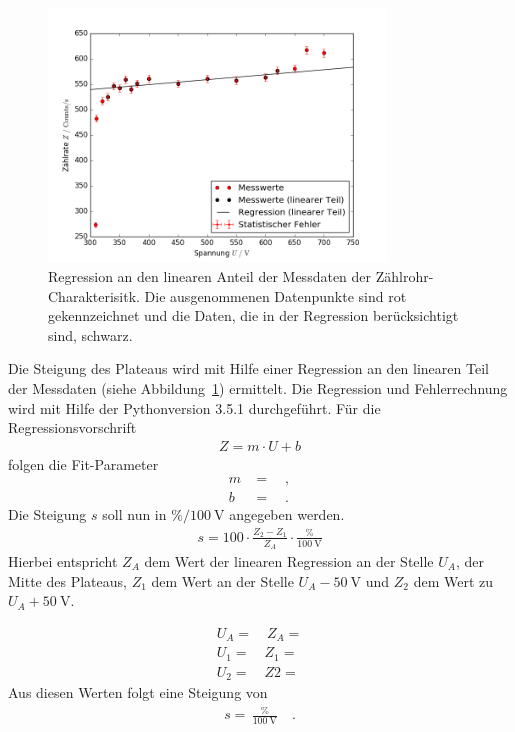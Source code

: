 \begin{figure}[h!]
	\centering
	\includegraphics[width=0.8\textwidth]{build/charakteristik_linear.png}
	\caption{Regression an den linearen Anteil der Messdaten der Zählrohr-Charakterisitk. Die ausgenommenen Datenpunkte sind rot gekennzeichnet und die Daten, die in der Regression berücksichtigt sind, schwarz.}
	\label{fig:charakteristik_linear}
\end{figure}

\clearpage
Die Steigung des Plateaus wird mit Hilfe einer Regression an den linearen Teil der Messdaten (siehe Abbildung~\ref{fig:charakteristik_linear}) ermittelt. Die Regression und Fehlerrechnung wird mit Hilfe der Pythonversion 3.5.1 durchgeführt. Für die Regressionsvorschrift
\begin{align}
	Z = m \cdot U +b
\end{align}
folgen die Fit-Parameter
\begin{align}
	m &= \quad , \\
	b &=  \quad .
\end{align}
Die Steigung $s$ soll nun in $\si{\percent}/\SI{100}{\volt}$ angegeben werden.
\begin{align}
	s = 100 \cdot \frac{Z_2 - Z_1}{Z_A} \cdot \frac{\si{\percent}}{\SI{100}{\volt}}
\end{align}
Hierbei entspricht $Z_A$ dem Wert der linearen Regression an der Stelle $U_A$, der Mitte des Plateaus, $Z_1$ dem Wert an der Stelle $U_A - \SI{50}{\volt}$ und $Z_2$ dem Wert zu $U_A + \SI{50}{\volt}$.

\begin{align}
	U_A =  \quad Z_A =  \\
	U_1 =  \quad Z_1 =  \\
	U_2 =  \quad Z2 = 
\end{align}
Aus diesen Werten folgt eine Steigung von
\begin{align}
	s =  \, \frac{\si{\percent}}{\SI{100}{\volt}} \quad .
\end{align}



